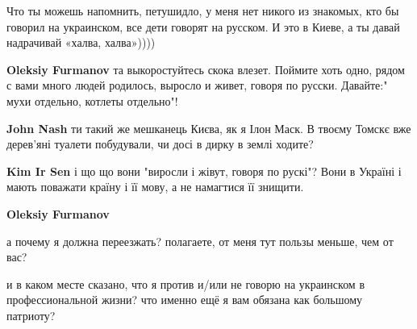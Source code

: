 \begin{itemize}
\begin{itemize}
 

Что ты можешь напомнить, петушидло, у меня нет никого из знакомых, кто бы
говорил на украинском, все дети говорят на русском. И это в Киеве, а ты давай
надрачивай «халва, халва»))))

 
\textbf{Oleksiy Furmanov} та выкоростуйтесь скока влезет. Поймите хоть одно, рядом с вами много людей родилось, выросло и живет, говоря по русски. Давайте:" мухи отдельно, котлеты отдельно"!

 
\textbf{John Nash} ти такий же мешканець Києва, як я Ілон Маск. В твоєму Томскє вже дерев'яні туалети побудували, чи досі в дирку в землі ходите?

 
\textbf{Kim Ir Sen} і що що вони "виросли і жівут, говоря по рускі"? Вони в Україні і мають поважати країну і її мову, а не намагтися її знищити.

 
\textbf{Oleksiy Furmanov} 

а почему я должна переезжать? полагаете, от меня тут пользы меньше, чем от вас?

и в каком месте сказано, что я против и/или не говорю на украинском в
профессиональной жизни? что именно ещё я вам обязана как большому патриоту?


\end{itemize}
\end{itemize}
